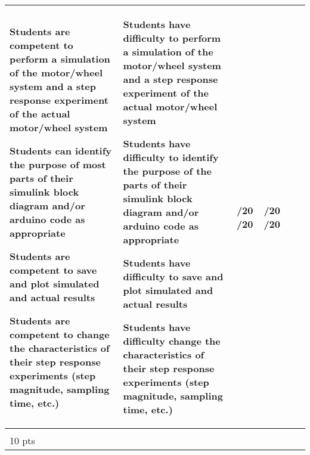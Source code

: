 \documentclass[11pt,landscape]{amsart}
\begin{document}
\begin{tabular}{llllcc}
\begin{minipage}{2.5in}\begin{list}{}{\leftmargin=1em}
\item Students are competent to perform a simulation of the motor/wheel system and a step response experiment of the actual motor/wheel system
\item Students can identify the purpose of most parts of their simulink block diagram and/or arduino code as appropriate
\item Students are competent to save and plot simulated and actual results
\item Students are competent to  change the characteristics of their step response experiments (step magnitude, sampling time, etc.) 
\end{list}
\end{minipage}
 &

\begin{minipage}{2.5in}\begin{list}{}{\leftmargin=1em}
\item Students have difficulty to perform a simulation of the motor/wheel system and a step response experiment of the actual motor/wheel system
\item Students have difficulty to identify the purpose of the parts of their simulink block diagram and/or arduino code as appropriate
\item Students have difficulty to save and plot simulated and actual results
\item Students have difficulty  change the characteristics of their step response experiments (step magnitude, sampling time, etc.) 
\end{list}
\end{minipage}
& \begin{minipage}{0.4in}\underline{\hspace{.25in}}/20  \underline{\hspace{.25in}}/20\end{minipage} 
& \begin{minipage}{0.4in}\underline{\hspace{.25in}}/20  \underline{\hspace{.25in}}/20\end{minipage} 
 \\[2pt]\midrule
 

\begin{sideways}\hspace{-.5in}\begin{minipage}{1in}\begin{center}\textbf{Reflection Logs} \\ 10 pts\end{center}\end{minipage}\end{sideways}  &


\end{tabular}
\end{document}

